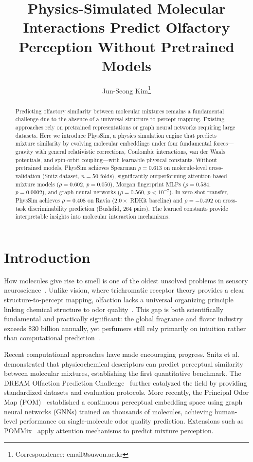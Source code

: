 \documentclass[11pt,a4paper]{article}
\title{\textbf{Physics-Simulated Molecular Interactions Predict Olfactory Perception Without Pretrained Models}}
\author[1]{Jun-Seong Kim\thanks{Correspondence: email@suwon.ac.kr}}
\affil[1]{Department of Computer Science, University of Suwon, Hwaseong-si, Gyeonggi-do, Republic of Korea}
\date{}
\begin{document}
\maketitle

\begin{abstract}
Predicting olfactory similarity between molecular mixtures remains a fundamental challenge due to the absence of a universal structure-to-percept mapping. Existing approaches rely on pretrained representations or graph neural networks requiring large datasets. Here we introduce PhysSim, a physics simulation engine that predicts mixture similarity by evolving molecular embeddings under four fundamental forces---gravity with general relativistic corrections, Coulombic interactions, van der Waals potentials, and spin-orbit coupling---with learnable physical constants. Without pretrained models, PhysSim achieves Spearman $\rho = 0.613$ on molecule-level cross-validation (Snitz dataset, $n = 50$ folds), significantly outperforming attention-based mixture models ($\rho = 0.602$, $p = 0.050$), Morgan fingerprint MLPs ($\rho = 0.584$, $p = 0.0002$), and graph neural networks ($\rho = 0.560$, $p < 10^{-7}$). In zero-shot transfer, PhysSim achieves $\rho = 0.408$ on Ravia ($2.0\times$ RDKit baseline) and $\rho = -0.492$ on cross-task discriminability prediction (Bushdid, 264 pairs). The learned constants provide interpretable insights into molecular interaction mechanisms.
\end{abstract}

\section{Introduction}

How molecules give rise to smell is one of the oldest unsolved problems in sensory neuroscience~\cite{sell2006}. Unlike vision, where trichromatic receptor theory provides a clear structure-to-percept mapping, olfaction lacks a universal organizing principle linking chemical structure to odor quality~\cite{keller2016,mainland2014}. This gap is both scientifically fundamental and practically significant: the global fragrance and flavor industry exceeds \$30 billion annually, yet perfumers still rely primarily on intuition rather than computational prediction~\cite{sell2014book}.

Recent computational approaches have made encouraging progress. Snitz et al.~\cite{snitz2013} demonstrated that physicochemical descriptors can predict perceptual similarity between molecular mixtures, establishing the first quantitative benchmark. The DREAM Olfaction Prediction Challenge~\cite{dream2025} further catalyzed the field by providing standardized datasets and evaluation protocols. More recently, the Principal Odor Map (POM)~\cite{lee2023pom} established a continuous perceptual embedding space using graph neural networks (GNNs) trained on thousands of molecules, achieving human-level performance on single-molecule odor quality prediction. Extensions such as POMMix~\cite{nguyen2025pommix} apply attention mechanisms to predict mixture perception.
\end{document}
